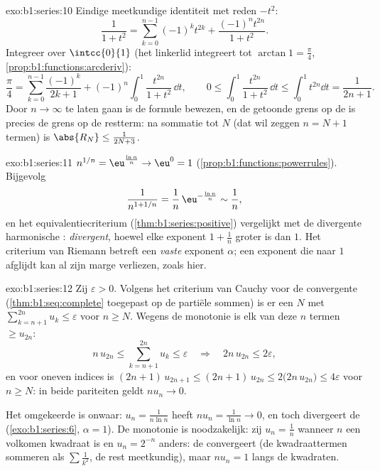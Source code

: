 \begin{solution}{exo:b1:series:10}
Eindige meetkundige identiteit met reden $-t^2$:
\[
\frac{1}{1 + t^2} = \sum_{k=0}^{n-1} (-1)^k t^{2k}
+ \frac{(-1)^n t^{2n}}{1 + t^2} .
\]
Integreer over $\intcc{0}{1}$ (het linkerlid integreert tot
$\arctan 1 = \frac\pi4$, \cref{prop:b1:functions:arcderiv}):
\[
\frac{\pi}{4} = \sum_{k=0}^{n-1} \frac{(-1)^k}{2k+1}
+ (-1)^n \int_0^1 \frac{t^{2n}}{1+t^2}\,\dd t,
\qquad
0 \leq \int_0^1 \frac{t^{2n}}{1+t^2}\,\dd t \leq \int_0^1 t^{2n}\dd
t = \frac{1}{2n+1} .
\]
Door $n \to \infty$ te laten gaan is de formule bewezen, en de
getoonde grens op de  is precies de grens op de restterm:
na sommatie tot $N$ (dat wil zeggen $n = N + 1$ termen) is
$\abs{R_N} \leq \frac{1}{2N + 3}$.
\end{solution}

\begin{solution}{exo:b1:series:11}
$n^{1/n} = \eu^{\frac{\ln n}{n}} \to \eu^0 = 1$
(\cref{prop:b1:functions:powerrules}). Bijgevolg
\[
\frac{1}{n^{1 + 1/n}} = \frac{1}{n}\,\eu^{-\frac{\ln n}{n}}
\sim \frac{1}{n} ,
\]
en het equivalentiecriterium (\cref{thm:b1:series:positive})
vergelijkt met de divergente harmonische : \emph{divergent},
hoewel elke exponent $1 + \frac1n$ groter is dan $1$. Het criterium
van Riemann betreft een \emph{vaste} exponent $\alpha$; een
exponent die naar $1$ afglijdt kan al zijn marge verliezen, zoals
hier.
\end{solution}

\begin{solution}{exo:b1:series:12}
Zij $\varepsilon > 0$. Volgens het criterium van Cauchy voor de
convergente  (\cref{thm:b1:seq:complete} toegepast op de
partiële sommen) is er een $N$ met $\sum_{k=n+1}^{2n} u_k \leq
\varepsilon$ voor $n \geq N$. Wegens de monotonie is elk van deze
$n$ termen $\geq u_{2n}$:
\[
n\,u_{2n} \leq \sum_{k=n+1}^{2n} u_k \leq \varepsilon
\quad\Longrightarrow\quad 2n\,u_{2n} \leq 2\varepsilon ,
\]
en voor oneven indices is $(2n+1)\,u_{2n+1} \leq (2n+1)\,u_{2n}
\leq 2\bigl(2n\,u_{2n}\bigr) \leq 4\varepsilon$ voor $n \geq N$: in
beide pariteiten geldt $n u_n \to 0$.

Het omgekeerde is onwaar: $u_n = \frac{1}{n\ln n}$ heeft $n u_n =
\frac{1}{\ln n} \to 0$, en toch divergeert de 
(\cref{exo:b1:series:6}, $\alpha = 1$). De monotonie is
noodzakelijk: zij $u_n = \frac1n$ wanneer $n$ een volkomen kwadraat
is en $u_n = 2^{-n}$ anders: de  convergeert (de
kwadraattermen sommeren als $\sum \frac{1}{k^2}$, de rest
meetkundig), maar $n u_n = 1$ langs de kwadraten.
\end{solution}


